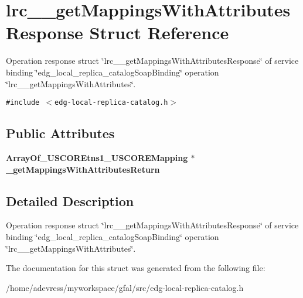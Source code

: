 \section{lrc\_\-\_\-get\-Mappings\-With\-Attributes\-Response Struct Reference}
\label{structlrc____getMappingsWithAttributesResponse}
Operation response struct \char`\"{}lrc\_\-\_\-get\-Mappings\-With\-Attributes\-Response\char`\"{} of service binding \char`\"{}edg\_\-local\_\-replica\_\-catalog\-Soap\-Binding\char`\"{} operation \char`\"{}lrc\_\-\_\-get\-Mappings\-With\-Attributes\char`\"{}.  


{\tt \#include $<$edg-local-replica-catalog.h$>$}

\subsection*{Public Attributes}
\begin{CompactItemize}
\item 
\bf{Array\-Of\_\-USCOREtns1\_\-USCOREMapping} $\ast$ \textbf{\_\-get\-Mappings\-With\-Attributes\-Return}\label{structlrc____getMappingsWithAttributesResponse_111e34419f07a6afa141c3c6bbed7da2}

\end{CompactItemize}


\subsection{Detailed Description}
Operation response struct \char`\"{}lrc\_\-\_\-get\-Mappings\-With\-Attributes\-Response\char`\"{} of service binding \char`\"{}edg\_\-local\_\-replica\_\-catalog\-Soap\-Binding\char`\"{} operation \char`\"{}lrc\_\-\_\-get\-Mappings\-With\-Attributes\char`\"{}. 



The documentation for this struct was generated from the following file:\begin{CompactItemize}
\item 
/home/adevress/myworkspace/gfal/src/edg-local-replica-catalog.h\end{CompactItemize}
